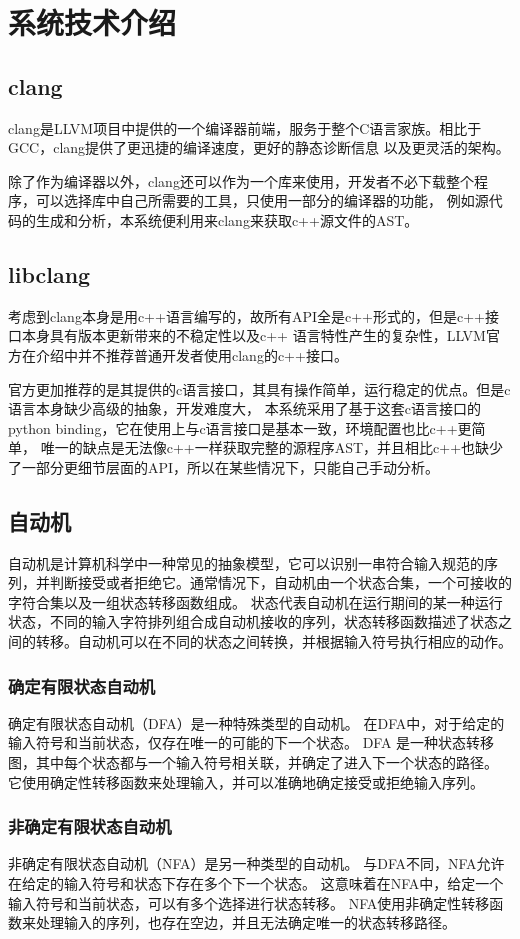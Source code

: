 \chapter{系统技术介绍}

\section{clang}
clang是LLVM项目中提供的一个编译器前端，服务于整个C语言家族。相比于GCC，clang提供了更迅捷的编译速度，更好的静态诊断信息
以及更灵活的架构。

除了作为编译器以外，clang还可以作为一个库来使用，开发者不必下载整个程序，可以选择库中自己所需要的工具，只使用一部分的编译器的功能，
例如源代码的生成和分析，本系统便利用来clang来获取c++源文件的AST。
\section{libclang}
考虑到clang本身是用c++语言编写的，故所有API全是c++形式的，但是c++接口本身具有版本更新带来的不稳定性以及c++
语言特性产生的复杂性，LLVM官方在介绍中并不推荐普通开发者使用clang的c++接口。

官方更加推荐的是其提供的c语言接口，其具有操作简单，运行稳定的优点。但是c语言本身缺少高级的抽象，开发难度大，
本系统采用了基于这套c语言接口的python binding，它在使用上与c语言接口是基本一致，环境配置也比c++更简单，
唯一的缺点是无法像c++一样获取完整的源程序AST，并且相比c++也缺少了一部分更细节层面的API，所以在某些情况下，只能自己手动分析。
\section{自动机}
自动机是计算机科学中一种常见的抽象模型，它可以识别一串符合输入规范的序列，并判断接受或者拒绝它。通常情况下，自动机由一个状态合集，一个可接收的字符合集以及一组状态转移函数组成。
状态代表自动机在运行期间的某一种运行状态，不同的输入字符排列组合成自动机接收的序列，状态转移函数描述了状态之间的转移。自动机可以在不同的状态之间转换，并根据输入符号执行相应的动作。
\subsection{确定有限状态自动机}
确定有限状态自动机（DFA）是一种特殊类型的自动机。
在DFA中，对于给定的输入符号和当前状态，仅存在唯一的可能的下一个状态。
DFA 是一种状态转移图，其中每个状态都与一个输入符号相关联，并确定了进入下一个状态的路径。
它使用确定性转移函数来处理输入，并可以准确地确定接受或拒绝输入序列。
\subsection{非确定有限状态自动机}
非确定有限状态自动机（NFA）是另一种类型的自动机。
与DFA不同，NFA允许在给定的输入符号和状态下存在多个下一个状态。
这意味着在NFA中，给定一个输入符号和当前状态，可以有多个选择进行状态转移。
NFA使用非确定性转移函数来处理输入的序列，也存在空边，并且无法确定唯一的状态转移路径。

